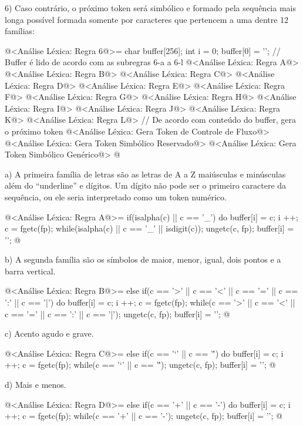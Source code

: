 6) Caso contrário, o próximo token será simbólico e formado pela
sequência mais longa possível formada somente por caracteres que
pertencem a uma dentre 12 famílias:

\iniciocodigo
@<Análise Léxica: Regra 6@>=
{
  char buffer[256];
  int i = 0;
  buffer[0] = '\0';
  // Buffer é lido de acordo com as subregras 6-a a 6-l
  @<Análise Léxica: Regra A@>
  @<Análise Léxica: Regra B@>
  @<Análise Léxica: Regra C@>
  @<Análise Léxica: Regra D@>
  @<Análise Léxica: Regra E@>
  @<Análise Léxica: Regra F@>
  @<Análise Léxica: Regra G@>
  @<Análise Léxica: Regra H@>
  @<Análise Léxica: Regra I@>
  @<Análise Léxica: Regra J@>
  @<Análise Léxica: Regra K@>
  @<Análise Léxica: Regra L@>
  // De acordo com conteúdo do buffer, gera o próximo token
  @<Análise Léxica: Gera Token de Controle de Fluxo@>
  @<Análise Léxica: Gera Token Simbólico Reservado@>
  @<Análise Léxica: Gera Token Simbólico Genérico@>
}
@
\fimcodigo


a) A primeira família de letras são as letras de A a Z maiúsculas e
minúsculas além do ``underline'' e dígitos. Um dígito não pode ser o
primeiro caractere da sequência, ou ele seria interpretado como um
token numérico.

\iniciocodigo
@<Análise Léxica: Regra A@>=
if(isalpha(c) || c == '_'){
  do{
    buffer[i] = c;
    i ++;
    c = fgetc(fp);
  } while(isalpha(c) || c == '_' || isdigit(c));
  ungetc(c, fp);
  buffer[i] = '\0';
}
@
\fimcodigo

b) A segunda família são os símbolos de maior, menor, igual, dois
pontos e a barra vertical.

\iniciocodigo
@<Análise Léxica: Regra B@>=
else if(c == '>' || c == '<' || c == '=' || c == ':' || c == '|'){
  do{
    buffer[i] = c;
    i ++;
    c = fgetc(fp);
  } while(c == '>' || c == '<' || c == '=' || c == ':' || c == '|');
  ungetc(c, fp);
  buffer[i] = '\0';
}
@
\fimcodigo

c) Acento agudo e grave.

\iniciocodigo
@<Análise Léxica: Regra C@>=
else if(c == '`' || c == '\''){
  do{
    buffer[i] = c;
    i ++;
    c = fgetc(fp);
  } while(c == '`' || c == '\'');
  ungetc(c, fp);
  buffer[i] = '\0';
}
@
\fimcodigo

d) Mais e menos.

\iniciocodigo
@<Análise Léxica: Regra D@>=
else if(c == '+' || c == '-'){
  do{
    buffer[i] = c;
    i ++;
    c = fgetc(fp);
  } while(c == '+' || c == '-');
  ungetc(c, fp);
  buffer[i] = '\0';
}
@
\fimcodigo

